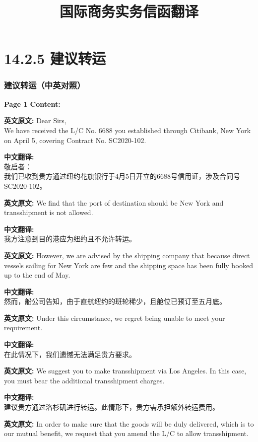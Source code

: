 \documentclass{ctexbeamer}
\begin{document}
\title{国际商务实务信函翻译}
\author{}
\date{}

\begin{frame}
\titlepage
\end{frame}

\section{14.2.5 建议转运}
\begin{frame}[allowframebreaks]
\frametitle{建议转运（中英对照）}
\textbf{Page 1 Content:}

\medskip
\textbf{英文原文:}
Dear Sirs,\\
We have received the L/C No. 6688 you established through Citibank, New York on April 5, covering Contract No. SC2020-102. 

\smallskip
\textbf{中文翻译:}\\
敬启者：\\
我们已收到贵方通过纽约花旗银行于4月5日开立的6688号信用证，涉及合同号SC2020-102。

\medskip
\textbf{英文原文:}
We find that the port of destination should be New York and transshipment is not allowed.

\smallskip
\textbf{中文翻译:}\\
我方注意到目的港应为纽约且不允许转运。

\medskip
\textbf{英文原文:}
However, we are advised by the shipping company that because direct vessels sailing for New York are few and the shipping space has been fully booked up to the end of May.

\smallskip
\textbf{中文翻译:}\\
然而，船公司告知，由于直航纽约的班轮稀少，且舱位已预订至五月底。

\medskip
\textbf{英文原文:}
Under this circumstance, we regret being unable to meet your requirement.

\smallskip
\textbf{中文翻译:}\\
在此情况下，我们遗憾无法满足贵方要求。

\medskip
\textbf{英文原文:}
We suggest you to make transshipment via Los Angeles. In this case, you must bear the additional transshipment charges.

\smallskip
\textbf{中文翻译:}\\
建议贵方通过洛杉矶进行转运。此情形下，贵方需承担额外转运费用。

\framebreak

\textbf{英文原文:}
In order to make sure that the goods will be duly delivered, which is to our mutual benefit, we request that you amend the L/C to allow transshipment.


\end{frame}
\end{document}
